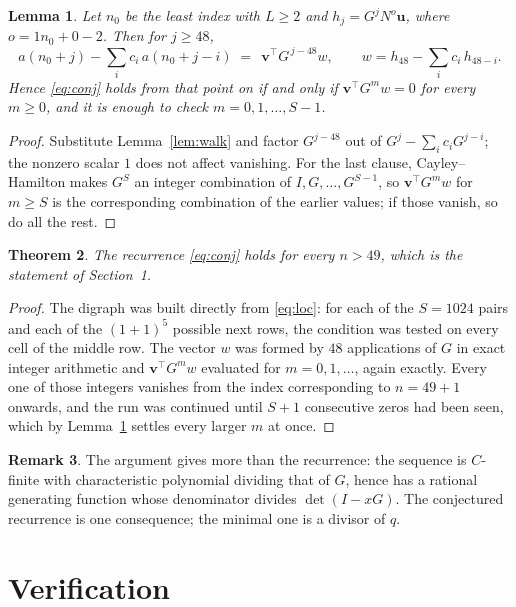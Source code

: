 \documentclass[11pt,a4paper]{article}
\theoremstyle{plain}
\newtheorem{theorem}{Theorem}
\newtheorem{lemma}[theorem]{Lemma}
\theoremstyle{definition}
\newtheorem{remark}[theorem]{Remark}
\begin{document}
\begin{lemma}\label{lem:crit}
Let $n_0$ be the least index with $L\ge2$ and $h_j=G^{j}N^{o}\mathbf{u}$, where
$o=1n_0+0-2$. Then for $j\ge48$,
\[
a(n_0+j)-\sum_i c_i\,a(n_0+j-i)\;=\;\,\mathbf{v}^{\!\top}G^{\,j-48}w,
\qquad w=h_{48}-\sum_i c_i\,h_{48-i} .
\]
Hence \eqref{eq:conj} holds from that point on if and only if
$\mathbf{v}^{\!\top}G^{m}w=0$ for every $m\ge0$, and it is enough to check
$m=0,1,\dots,S-1$.
\end{lemma}

\begin{proof}
Substitute Lemma~\ref{lem:walk} and factor $G^{j-48}$ out of
$G^{j}-\sum_ic_iG^{j-i}$; the nonzero scalar $1$ does not affect
vanishing. For the last clause, Cayley--Hamilton makes $G^{S}$ an integer combination of
$I,G,\dots,G^{S-1}$, so $\mathbf{v}^{\!\top}G^{m}w$ for $m\ge S$ is the corresponding
combination of the earlier values; if those vanish, so do all the rest.
\end{proof}

\begin{theorem}
The recurrence \eqref{eq:conj} holds for every $n>49$, which is the statement of
Section~1.
\end{theorem}

\begin{proof}
The digraph was built directly from \eqref{eq:loc}: for each of the $S=1024$ pairs and each
of the $(1+1)^{5}$ possible next rows, the condition was tested on every cell of
the middle row. The vector $w$ was formed by $48$ applications of $G$ in exact integer
arithmetic and $\mathbf{v}^{\!\top}G^{m}w$ evaluated for $m=0,1,\dots$, again exactly.
Every one of those integers vanishes from the index corresponding to $n=49+1$ onwards,
and the run was continued until $S+1$ consecutive zeros had been seen, which by
Lemma~\ref{lem:crit} settles every larger $m$ at once.
\end{proof}

\begin{remark}
The argument gives more than the recurrence: the sequence is $C$-finite with characteristic
polynomial dividing that of $G$, hence has a rational generating function whose denominator
divides $\det(I-xG)$. The conjectured recurrence is one consequence; the minimal one is a
divisor of $q$.
\end{remark}

\section{Verification}
\end{document}
